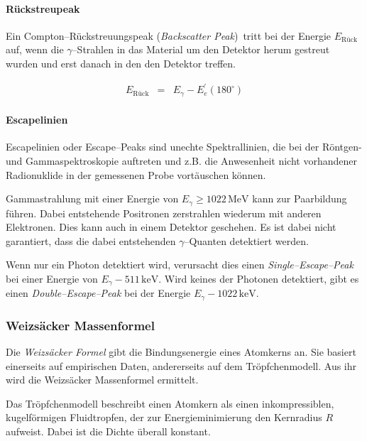 \documentclass[12pt,a4paper]{scrartcl}
\numberwithin{equation}{section} %
\newcommand{\pu}[1]{\ensuremath{\mathrm{#1}}}
\begin{document}
\paragraph{Rückstreupeak}

Ein Compton--Rückstreuungspeak (\emph{Backscatter Peak})~tritt bei der Energie $E_\mathrm{Rück}$ auf, wenn die $\gamma$--Strahlen in das Material um den Detektor herum gestreut wurden und erst danach in den
den Detektor treffen. \cite{Bethge}

\begin{eqnarray}
    E_\mathrm{Rück} &=& E_\gamma - E_e^\prime(180^\circ)
\end{eqnarray}

\paragraph{Escapelinien}

Escapelinien oder Escape--Peaks sind unechte Spektrallinien, die bei der Röntgen- und Gammaspektroskopie auftreten und z.B. die Anwesenheit nicht vorhandener Radionuklide in der gemessenen Probe vortäuschen können. \cite{Escapelinie}

Gammastrahlung mit einer Energie von $E_\gamma\ge\pu{1022\,MeV}$ kann zur Paarbildung führen. Dabei entstehende Positronen zerstrahlen wiederum mit anderen Elektronen. Dies kann auch in einem Detektor geschehen. Es ist dabei nicht garantiert, dass die dabei entstehenden $\gamma$--Quanten detektiert werden. \cite{Bethge}

Wenn nur ein Photon detektiert wird, verursacht dies einen \emph{Single--Escape--Peak} bei einer Energie von
$E_\gamma - \pu{511\, keV}$. Wird keines der Photonen detektiert, gibt es einen \emph{Double--Escape--Peak} bei der Energie $E_\gamma - \pu{1022\, keV}$.

\hypertarget{weizsuxe4cker-massenformel}{%
	\subsubsection{Weizsäcker Massenformel}\label{weizsuxe4cker-massenformel}}
Die \emph{Weizsäcker Formel} gibt die Bindungsenergie eines Atomkerns an. Sie basiert einerseits auf empirischen Daten, andererseits auf dem Tröpfchenmodell. Aus ihr wird die Weizsäcker Massenformel ermittelt.

Das Tröpfchenmodell beschreibt einen Atomkern als einen inkompressiblen, kugelförmigen Fluidtropfen, der zur Energieminimierung den Kernradius $R$ aufweist. Dabei ist die Dichte überall konstant.
\end{document}
